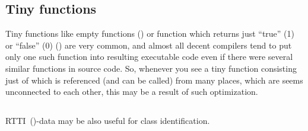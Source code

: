 \subsection{Tiny functions}

Tiny functions like empty functions ()
or function which returns just ``true'' (1) or ``false'' (0) () are very common,
and almost all decent compilers tend to put only one such function into resulting executable code even if there were several
similar functions in source code.
So, whenever you see a tiny function consisting just of 
which is referenced (and can be called) from many places,
which are seems unconnected to each other, this may be a result of such optimization.%

\subsection{\Cpp}

\ac{RTTI}~()-data may be also useful for \Cpp class identification.

